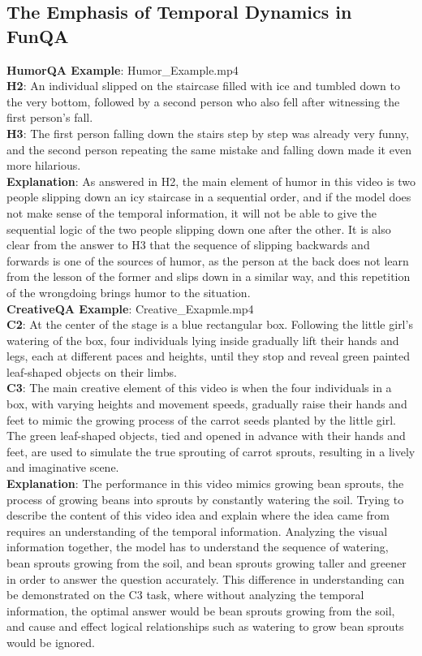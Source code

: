 \subsection{The Emphasis of Temporal Dynamics in FunQA}
\textbf{HumorQA Example}: Humor\_Example.mp4\\
\textbf{H2}: An individual slipped on the staircase filled with ice and tumbled down to the very bottom, followed by a second person who also fell after witnessing the first person's fall.\\
\textbf{H3}: The first person falling down the stairs step by step was already very funny, and the second person repeating the same mistake and falling down made it even more hilarious.\\
\textbf{Explanation}: As answered in H2, the main element of humor in this video is two people slipping down an icy staircase in a sequential order, and if the model does not make sense of the temporal information, it will not be able to give the sequential logic of the two people slipping down one after the other. It is also clear from the answer to H3 that the sequence of slipping backwards and forwards is one of the sources of humor, as the person at the back does not learn from the lesson of the former and slips down in a similar way, and this repetition of the wrongdoing brings humor to the situation.\\
\textbf{CreativeQA Example}: Creative\_Exapmle.mp4\\
\textbf{C2}: At the center of the stage is a blue rectangular box. Following the little girl's watering of the box, four individuals lying inside gradually lift their hands and legs, each at different paces and heights, until they stop and reveal green painted leaf-shaped objects on their limbs.\\
\textbf{C3}: The main creative element of this video is when the four individuals in a box, with varying heights and movement speeds, gradually raise their hands and feet to mimic the growing process of the carrot seeds planted by the little girl. The green leaf-shaped objects, tied and opened in advance with their hands and feet, are used to simulate the true sprouting of carrot sprouts, resulting in a lively and imaginative scene.\\
\textbf{Explanation}: The performance in this video mimics growing bean sprouts, the process of growing beans into sprouts by constantly watering the soil. Trying to describe the content of this video idea and explain where the idea came from requires an understanding of the temporal information. Analyzing the visual information together, the model has to understand the sequence of watering, bean sprouts growing from the soil, and bean sprouts growing taller and greener in order to answer the question accurately. This difference in understanding can be demonstrated on the C3 task, where without analyzing the temporal information, the optimal answer would be bean sprouts growing from the soil, and cause and effect logical relationships such as watering to grow bean sprouts would be ignored.